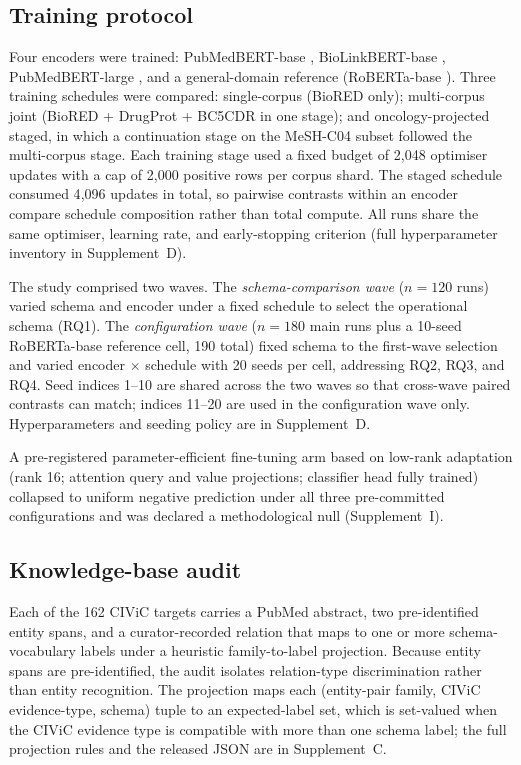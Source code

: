\subsection{Training protocol}
\label{sec:training}

Four encoders were trained: PubMedBERT-base
\citep{gu2021pubmedbert}, BioLinkBERT-base
\citep{yasunaga2022biolinkbert}, PubMedBERT-large
\citep{gu2021pubmedbert}, and a general-domain reference
(RoBERTa-base \citep{liu2019roberta}). Three training schedules were
compared: single-corpus (BioRED only); multi-corpus joint (BioRED +
DrugProt + BC5CDR in one stage); and oncology-projected staged, in
which a continuation stage on the MeSH-C04 subset followed the
multi-corpus stage. Each training stage used a fixed budget of
2{,}048 optimiser updates with a cap of 2{,}000 positive rows per
corpus shard. The staged schedule consumed 4{,}096 updates in
total, so pairwise contrasts within an encoder compare schedule
composition rather than total compute. All runs share the same
optimiser, learning rate, and early-stopping criterion (full
hyperparameter inventory in Supplement~D).

The study comprised two waves. The \emph{schema-comparison wave}
($n = 120$ runs) varied schema and encoder under a fixed schedule
to select the operational schema (RQ1). The \emph{configuration
wave} ($n = 180$ main runs plus a 10-seed RoBERTa-base reference
cell, 190 total) fixed schema to the first-wave selection and
varied encoder $\times$ schedule with 20 seeds per cell,
addressing RQ2, RQ3, and RQ4. Seed indices 1--10 are shared across
the two waves so that cross-wave paired contrasts can match;
indices 11--20 are used in the configuration wave only.
Hyperparameters and seeding policy are in Supplement~D.

A pre-registered parameter-efficient fine-tuning arm based on
low-rank adaptation \citep[LoRA;][]{hu2022lora} (rank 16; attention
query and value projections; classifier head fully trained)
collapsed to uniform negative prediction under all three
pre-committed configurations and was declared a methodological null
(Supplement~I).

\subsection{Knowledge-base audit}
\label{sec:kb-audit}

Each of the 162 CIViC targets carries a PubMed abstract, two
pre-identified entity spans, and a curator-recorded relation that
maps to one or more schema-vocabulary labels under a heuristic
family-to-label projection. Because entity spans are pre-identified,
the audit isolates relation-type discrimination rather than entity
recognition. The projection maps each (entity-pair family, CIViC
evidence-type, schema) tuple to an expected-label set, which is
set-valued when the CIViC evidence type is compatible with more
than one schema label; the full projection rules and the released
JSON are in Supplement~C.

